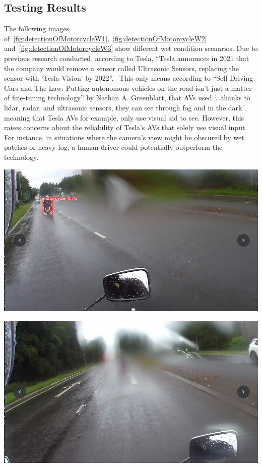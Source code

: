 \documentclass[a0,portrait]{a0poster}
\begin{document}
\begin{multicols}{2}
			

		\subsection*{Testing Results}
			The following images of~\ref{fig:detectionOfMotorcycleW1},~\ref{fig:detectionOfMotorcycleW2} and~\ref{fig:detectionOfMotorcycleW3} show different wet condition scenarios. Due to previous research conducted, according to Tesla, ``Tesla announces in 2021 that the company would remove a sensor called Ultrasonic Sensors, replacing the sensor with `Tesla Vision' by 2022''.~\cite{noauthor_tesla_nodate} This only means according to ``Self-Driving Cars and The Law: Putting autonomous vehicles on the road isn't just a matter of fine-tuning technology'' by Nathan A. Greenblatt, that AVs used `...thanks to lidar, radar, and ultrasonic sensors, they can see through fog and in the dark.', meaning that Tesla AVs for example, only use visual aid to see. However, this raises concerns about the reliability of Tesla's AVs that solely use visual input. For instance, in situations where the camera's view might be obscured by wet patches or heavy fog, a human driver could potentially outperform the technology.
			\begin{center}\vspace{1cm}
				\begin{minipage}{0.15\textwidth}
					\centering
					\includegraphics[width=\linewidth]{wet_correct.png}
					\label{fig:detectionOfMotorcycleW1}
				\end{minipage}\hfill
				\begin{minipage}{0.15\textwidth}
					\centering
					\includegraphics[width=\linewidth]{wet_incorrect.png}

\end{minipage}
\end{center}
\end{multicols}
\end{document}
